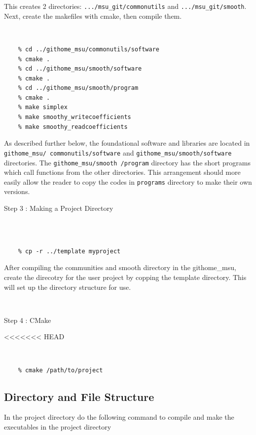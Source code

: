 \documentclass[12pt]{article}
\numberwithin{equation}{section}
\numberwithin{figure}{section}
\begin{document}
This creates 2 directories: {\tt .../msu\_git/commonutils} and {\tt .../msu\_git/smooth}. Next, create the makefiles with cmake, then compile them.\\
\vspace{-20pt}
{\tt 
\begin{verbatim}
    % cd ../githome_msu/commonutils/software
    % cmake .
    % cd ../githome_msu/smooth/software
    % cmake .
    % cd ../githome_msu/smooth/program
    % cmake .
    % make simplex
    % make smoothy_writecoefficients
    % make smoothy_readcoefficients
\end{verbatim}
}
As described further below, the foundational software and libraries are located in {\tt githome\_msu/ commonutils/software} and {\tt githome\_msu/smooth/software} directories. The {\tt githome\_msu/smooth /program} directory has the short programs which call functions from the other directories. This arrangement should more easily allow the reader to copy the codes in {\tt programs} directory to make their own versions.



\begin{description}
\item[Step 3 : Making a Project Directory] 
\end{description}
{\tt 
\begin{verbatim}

    % cp -r ../template myproject
\end{verbatim}
}
After compiling the communities and smooth directory in the githome\_msu, create the direcotry for the user project by copping the template directory. 
This will set up the directory structure for use. 

\\ 

\begin{description}
\item[Step 4 : CMake]
\end{description}
<<<<<<< HEAD
\vspace{-20pt}
{\tt 
\begin{verbatim}
    % cmake /path/to/project
\end{verbatim}
}

\subsection{Directory and File Structure}

In the project directory do the following command to compile and make the executables in the project directory  
\end{document}
